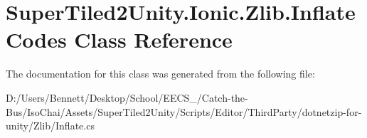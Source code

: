 \hypertarget{class_super_tiled2_unity_1_1_ionic_1_1_zlib_1_1_inflate_codes}{}\section{Super\+Tiled2\+Unity.\+Ionic.\+Zlib.\+Inflate\+Codes Class Reference}
\label{class_super_tiled2_unity_1_1_ionic_1_1_zlib_1_1_inflate_codes}


The documentation for this class was generated from the following file\+:\begin{DoxyCompactItemize}
\item 
D\+:/\+Users/\+Bennett/\+Desktop/\+School/\+E\+E\+C\+S\+\_/\+Catch-\/the-\/\+Bus/\+Iso\+Chai/\+Assets/\+Super\+Tiled2\+Unity/\+Scripts/\+Editor/\+Third\+Party/dotnetzip-\/for-\/unity/\+Zlib/Inflate.\+cs\end{DoxyCompactItemize}
